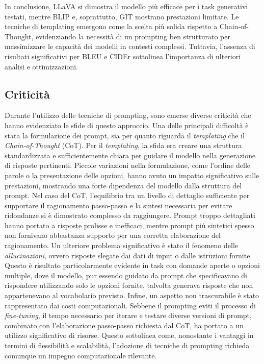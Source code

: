 \documentclass[../main.tex]{subfiles}
\begin{document}
In conclusione, LLaVA si dimostra il modello più efficace per i task generativi testati, mentre BLIP e, soprattutto, GIT mostrano prestazioni limitate. Le tecniche di templating emergono come la scelta più solida rispetto a Chain-of-Thought, evidenziando la necessità di un prompting ben strutturato per massimizzare le capacità dei modelli in contesti complessi. Tuttavia, l'assenza di risultati significativi per BLEU e CIDEr sottolinea l'importanza di ulteriori analisi e ottimizzazioni.

\subsection{Criticità}

Durante l'utilizzo delle tecniche di prompting, sono emerse diverse criticità che hanno evidenziato le sfide di questo approccio. 
Una delle principali difficoltà è stata la formulazione dei prompt, sia per quanto riguarda il \textit{templating} che il \textit{Chain-of-Thought} (CoT). 
Per il \textit{templating}, la sfida era creare una struttura standardizzata e sufficientemente chiara per guidare il modello nella generazione di risposte pertinenti. Piccole variazioni nella formulazione, come l'ordine delle parole o la presentazione delle opzioni, hanno avuto un impatto significativo sulle prestazioni, mostrando una forte dipendenza del modello dalla struttura del prompt. 
Nel caso del CoT, l'equilibrio tra un livello di dettaglio sufficiente per supportare il ragionamento passo-passo e la sintesi necessaria per evitare ridondanze si è dimostrato complesso da raggiungere. 
Prompt troppo dettagliati hanno portato a risposte prolisse e inefficaci, mentre prompt più sintetici spesso non fornivano abbastanza supporto per una corretta elaborazione del ragionamento. 
Un ulteriore problema significativo è stato il fenomeno delle \textit{allucinazioni}, ovvero risposte slegate dai dati di input o dalle istruzioni fornite. Questo è risultato particolarmente evidente in task con domande aperte o opzioni multiple, dove il modello, pur essendo guidato da prompt che specificavano di rispondere utilizzando solo le opzioni fornite, talvolta generava risposte che non appartenevano al vocabolario previsto. 
Infine, un aspetto non trascurabile è stato rappresentato dai costi computazionali. Sebbene il prompting eviti il processo di \textit{fine-tuning}, il tempo necessario per iterare e testare diverse versioni di prompt, combinato con l'elaborazione passo-passo richiesta dal CoT, ha portato a un utilizzo significativo di risorse. Questo sottolinea come, nonostante i vantaggi in termini di flessibilità e scalabilità, l'adozione di tecniche di prompting richieda comunque un impegno computazionale rilevante. 
\end{document}
